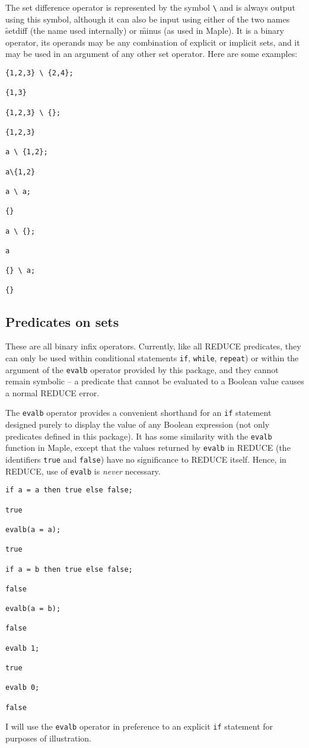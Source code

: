 The set difference operator is represented by the symbol \texttt{\textbackslash} and
is always output using this symbol, although it can also be input using
either of the two names \f{setdiff} (the name used internally) or
\f{minus} (as used in Maple).  It is a binary operator, its operands
may be any combination of explicit or implicit sets, and it may be
used in an argument of any other set operator.  Here are some
examples:
\begin{verbatim}
{1,2,3} \ {2,4};

{1,3}

{1,2,3} \ {};

{1,2,3}

a \ {1,2};

a\{1,2}

a \ a;

{}

a \ {};

a

{} \ a;

{}
\end{verbatim}


\subsection{Predicates on sets}

These are all binary infix operators.  Currently, like all REDUCE
predicates, they can only be used within conditional statements
\texttt{if}, \texttt{while}, \texttt{repeat}) or within the argument of the
\texttt{evalb} operator provided by this package, and they cannot remain
symbolic -- a predicate that cannot be evaluated to a Boolean value
causes a normal REDUCE error.

The \texttt{evalb} operator provides a convenient shorthand for an \texttt{if}
statement designed purely to display the value of any Boolean
expression (not only predicates defined in this package).  It has some
similarity with the \texttt{evalb} function in Maple, except that the
values returned by \texttt{evalb} in REDUCE (the identifiers \texttt{true}
and \texttt{false}) have no significance to REDUCE itself.  Hence, in
REDUCE, use of \texttt{evalb} is {\em never\/} necessary.
\begin{verbatim}
if a = a then true else false;

true

evalb(a = a);

true

if a = b then true else false;

false

evalb(a = b);

false

evalb 1;

true

evalb 0;

false
\end{verbatim}
I will use the \texttt{evalb} operator in preference to an explicit
\texttt{if} statement for purposes of illustration.


